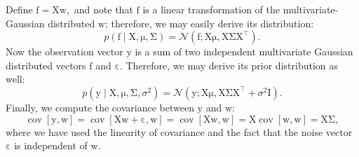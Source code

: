 \documentclass{article}
\newcommand{\given}{\mid}
\newcommand{\mc}[1]{\mathcal{#1}}
\newcommand{\trans}{^\top}
\newcommand{\mat}[1]{\bm{\mathrm{#1}}}
\renewcommand{\vec}[1]{\bm{\mathrm{#1}}}
\renewcommand{\epsilon}{\varepsilon}
\DeclareMathOperator{\cov}{cov}
\begin{document}
Define $\vec{f} = \mat{X}\vec{w},$ and note that $\vec{f}$ is a linear
transformation of the multivariate-Gaussian distributed $\vec{w}$;
therefore, we may easily derive its distribution:
\begin{equation*}
  p(\vec{f} \given \mat{X}, \vec{\mu}, \mat{\Sigma})
  =
  \mc{N}(\vec{f}; \mat{X}\vec{\mu}, \mat{X}\mat{\Sigma}\mat{X}\trans).
\end{equation*}
Now the observation vector $\vec{y}$ is a sum of two independent
multivariate Gaussian distributed vectors $\vec{f}$ and
$\vec{\epsilon}$.  Therefore, we may derive its prior distribution as
well:
\begin{equation*}
  p(\vec{y} \given \vec{X}, \vec{\mu}, \mat{\Sigma}, \sigma^2)
  =
  \mc{N}(
  \vec{y};
  \mat{X}\vec{\mu},
  \mat{X}\mat{\Sigma}\mat{X}\trans + \sigma^2\mat{I}
  ).
\end{equation*}
Finally, we compute the covariance between $\vec{y}$ and $\vec{w}$:
\begin{equation*}
  \cov[\vec{y}, \vec{w}]
  =
  \cov[\mat{X}\vec{w} + \vec{\epsilon}, \vec{w}]
  =
  \cov[\mat{X}\vec{w}, \vec{w}]
  =
  \mat{X}\cov[\vec{w}, \vec{w}]
  =
  \mat{X}\mat{\Sigma},
\end{equation*}
where we have used the linearity of covariance and the fact that
the noise vector $\vec{\epsilon}$ is independent of $\vec{w}$.
\end{document}
